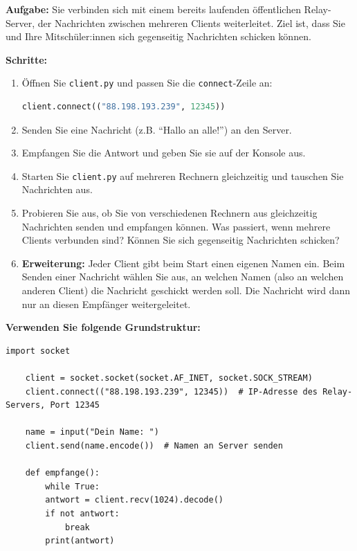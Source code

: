 \begin{myexercise}

    \textbf{Aufgabe:} Sie verbinden sich mit einem bereits laufenden öffentlichen Relay-Server, der Nachrichten zwischen mehreren Clients weiterleitet. Ziel ist, dass Sie und Ihre Mitschüler:innen sich gegenseitig Nachrichten schicken können.

    \textbf{Schritte:}
    \begin{enumerate}
        \item Öffnen Sie \texttt{client.py} und passen Sie die \texttt{connect}-Zeile an:
              \begin{lstlisting}[language=Python]
client.connect(("88.198.193.239", 12345))
        \end{lstlisting}
        \item Senden Sie eine Nachricht (z.B. \enquote{Hallo an alle!}) an den Server.
        \item Empfangen Sie die Antwort und geben Sie sie auf der Konsole aus.
        \item Starten Sie \texttt{client.py} auf mehreren Rechnern gleichzeitig und tauschen Sie Nachrichten aus.
        \item Probieren Sie aus, ob Sie von verschiedenen Rechnern aus gleichzeitig Nachrichten senden und empfangen können. Was passiert, wenn mehrere Clients verbunden sind? Können Sie sich gegenseitig Nachrichten schicken?
        \item \textbf{Erweiterung:} Jeder Client gibt beim Start einen eigenen Namen ein. Beim Senden einer Nachricht wählen Sie aus, an welchen Namen (also an welchen anderen Client) die Nachricht geschickt werden soll. Die Nachricht wird dann nur an diesen Empfänger weitergeleitet.

    \end{enumerate}

    \textbf{Verwenden Sie folgende Grundstruktur:}

    \begin{lstlisting}[caption={client.py}]
    import socket

    client = socket.socket(socket.AF_INET, socket.SOCK_STREAM)
    client.connect(("88.198.193.239", 12345))  # IP-Adresse des Relay-Servers, Port 12345

    name = input("Dein Name: ")
    client.send(name.encode())  # Namen an Server senden

    def empfange():
        while True:
        antwort = client.recv(1024).decode()
        if not antwort:
            break
        print(antwort)


\end{lstlisting}
\end{myexercise}
